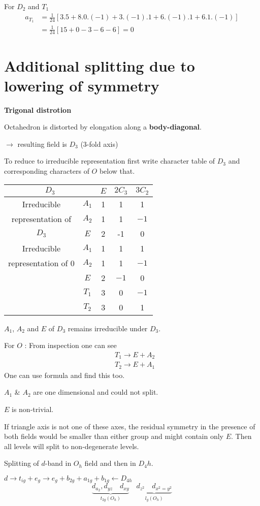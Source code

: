 \begin{example*}
For $D_{2}$  and $T_{1}$
\begin{align*}
a_{T_{1}} &= \frac{1}{24}[3.5+8.0.(-1)+3.(-1).1+6.(-1).1+6.1.(-1)]\\
&= \frac{1}{24}[15+0-3-6-6]=0
\end{align*}
\end{example*}

\section*{Additional splitting due to lowering of symmetry}

\textbf{Trigonal distrotion}

Octahedron is distorted by elongation along a {\bf body-diagonal}.

$\to$ resulting field is $D_{3}$ (3-fold axis)

To reduce to irreducible representation first write character table of $D_{3}$ and corresponding characters of $O$ below that.
\begin{center}
\begin{tabular}{cc|ccc}
\hline
\multicolumn{2}{c|}{$D_{3}$} & $E$ & $2C_{3}$ & $3C_{2}$\\
\hline
Irreducible & $A_{1}$ & 1 & 1 & 1\\
representation of & $A_{2}$ & 1 & 1 & $-1$\\
$D_{3}$ & $E$ & 2 & -1 & 0\\
Irreducible & $A_{1}$ & 1 & 1 & 1\\
representation of $0$ & $A_{2}$ & 1 & 1 & $-1$\\
 & $E$ & 2 & $-1$ & 0\\
 & $T_{1}$ & 3 & 0 & $-1$\\
 & $T_{2}$ & 3 & 0 & 1\\
\hline
\end{tabular}
\end{center}
$A_{1}$, $A_{2}$ and $E$ of $D_{3}$ remains irreducible under $D_{3}$.

For $O$ : From inspection one can see
\begin{align*}
& T_{1}\to E+A_{2}\\
& T_{2}\to E+A_{1}
\end{align*}
One can use formula and find this too.

$A_{1}$ \& $A_{2}$ are one dimensional and could not split.

$E$ is non-trivial.

If triangle axis is not one of these axes, the residual symmetry in the presence of both fields would be smaller than either group and might contain only $E$. Then all levels will split to non-degenerate levels.

Splitting of $d$-band in $O_{h}$ field and then in $D_{4}h$.

$d\to t_{ig}+e_{g}\to e_{g}+b_{2g}+a_{1g}+b_{1g}\leftarrow D_{4h}$
$$
\underbrace{d_{a_{2}},d_{yz}\quad d_{xy}}_{t_{2g}(O_{h})}\quad \underbrace{d_{z^{2}}\quad d_{x^{2}=y^{2}}}_{l_{g}(O_{h})}
$$
